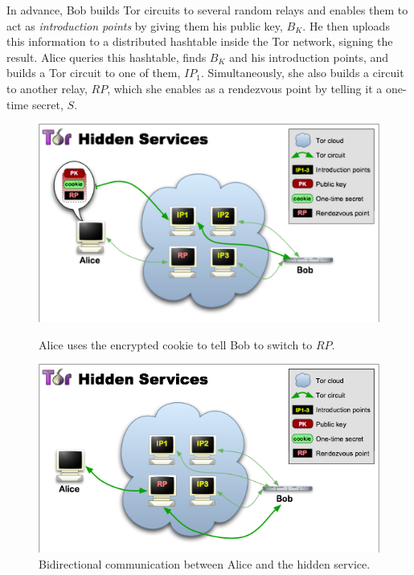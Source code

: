 In advance, Bob builds Tor circuits to several random relays and enables them to act as \textit{introduction points} by giving them his public key, $B_{K}$. He then uploads this information to a distributed hashtable inside the Tor network, signing the result. Alice queries this hashtable, finds $B_{K}$ and his introduction points, and builds a Tor circuit to one of them, $IP_{1}$. Simultaneously, she also builds a circuit to another relay, $RP$, which she enables as a rendezvous point by telling it a one-time secret, $S$.

\begin{figure}[htdp]
	\begin{minipage}[b]{0.45\linewidth}
		\centering
		\includegraphics[width=\textwidth]{images/tor-hidden-service-4-higher.png}
		\caption{Alice uses the encrypted cookie to tell Bob to switch to $RP$.}
		\label{fig:figure4}
	\end{minipage}
	\hspace{0.5cm}
	\begin{minipage}[b]{0.45\linewidth}
		\centering
		\includegraphics[width=\textwidth]{images/tor-hidden-service-6.png}
		\caption{Bidirectional communication between Alice and the hidden service.}
		\label{fig:figure5}
	\end{minipage}
\end{figure}

